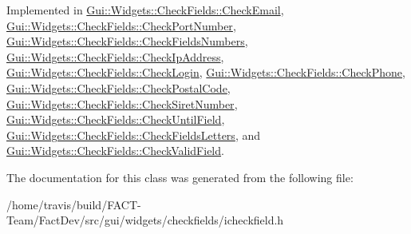 Implemented in \hyperlink{classGui_1_1Widgets_1_1CheckFields_1_1CheckEmail_a166b7e7d39ca307a52477b2d9ef65ef1}{Gui\-::\-Widgets\-::\-Check\-Fields\-::\-Check\-Email}, \hyperlink{classGui_1_1Widgets_1_1CheckFields_1_1CheckPortNumber_aca2bfa31e06451c77a7a38020c2819b7}{Gui\-::\-Widgets\-::\-Check\-Fields\-::\-Check\-Port\-Number}, \hyperlink{classGui_1_1Widgets_1_1CheckFields_1_1CheckFieldsNumbers_ade88f674fc2cbbeb514cdf81c0f63487}{Gui\-::\-Widgets\-::\-Check\-Fields\-::\-Check\-Fields\-Numbers}, \hyperlink{classGui_1_1Widgets_1_1CheckFields_1_1CheckIpAddress_a785f3ccf0fba4db3e83bfaaaea37455e}{Gui\-::\-Widgets\-::\-Check\-Fields\-::\-Check\-Ip\-Address}, \hyperlink{classGui_1_1Widgets_1_1CheckFields_1_1CheckLogin_a66e6d426253b5219a55b7ccada37d9b9}{Gui\-::\-Widgets\-::\-Check\-Fields\-::\-Check\-Login}, \hyperlink{classGui_1_1Widgets_1_1CheckFields_1_1CheckPhone_a15e8da6b25e752c6fb816e6655bdb062}{Gui\-::\-Widgets\-::\-Check\-Fields\-::\-Check\-Phone}, \hyperlink{classGui_1_1Widgets_1_1CheckFields_1_1CheckPostalCode_a27abf247ec158aafb2c13779f6630449}{Gui\-::\-Widgets\-::\-Check\-Fields\-::\-Check\-Postal\-Code}, \hyperlink{classGui_1_1Widgets_1_1CheckFields_1_1CheckSiretNumber_a973f81b959d34b28818159303932f5f8}{Gui\-::\-Widgets\-::\-Check\-Fields\-::\-Check\-Siret\-Number}, \hyperlink{classGui_1_1Widgets_1_1CheckFields_1_1CheckUntilField_ad8d3923aa32bbcba0d73bb4240fe96e8}{Gui\-::\-Widgets\-::\-Check\-Fields\-::\-Check\-Until\-Field}, \hyperlink{classGui_1_1Widgets_1_1CheckFields_1_1CheckFieldsLetters_a95f6808ecc2cedf22407fc1791827851}{Gui\-::\-Widgets\-::\-Check\-Fields\-::\-Check\-Fields\-Letters}, and \hyperlink{classGui_1_1Widgets_1_1CheckFields_1_1CheckValidField_a871d7b28becd80aac9fc75a2057bb15d}{Gui\-::\-Widgets\-::\-Check\-Fields\-::\-Check\-Valid\-Field}.



The documentation for this class was generated from the following file\-:\begin{DoxyCompactItemize}
\item 
/home/travis/build/\-F\-A\-C\-T-\/\-Team/\-Fact\-Dev/src/gui/widgets/checkfields/icheckfield.\-h\end{DoxyCompactItemize}

